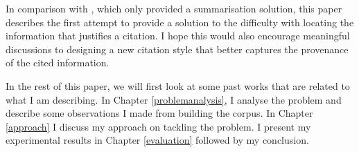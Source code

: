 In comparison with \cite{csibs}, which only provided a summarisation solution, this paper describes the first attempt to provide a solution to the difficulty with locating the information that justifies a citation. I hope this would also encourage meaningful discussions to designing a new citation style that better captures the provenance of the cited information.

In the rest of this paper, we will first look at some past works that are related to what I am describing. In Chapter \ref{problemanalysis}, I analyse the problem and describe some observations I made from building the corpus. In Chapter \ref{approach} I discuss my approach on tackling the problem. I present my experimental results in Chapter \ref{evaluation} followed by my conclusion.
